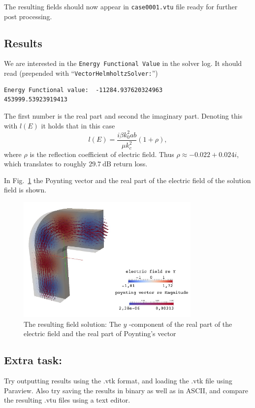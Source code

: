The resulting fields should now appear in \texttt{case0001.vtu} file ready for further post processing.

\subsection*{Results}
We are interested in the \texttt{Energy Functional Value} in the solver log. It should read (prepended with ``\texttt{VectorHelmholtzSolver:}'')

\small{
\begin{verbatim}
Energy Functional value:  -11284.937620324963        453999.53923919413
\end{verbatim}
}

The first number is the real part and second the imaginary part. Denoting this with $l(E)$ it holds that in this case \[l(E) = \frac {i \beta k_0^2 ab}{\mu k_c^2} (1+\rho),\] where $\rho$ is the reflection coefficient of electric field. Thus $\rho\approx-0.022+0.024i$, which translates to roughly $29.7~\mathrm{dB}$ return loss.

In Fig.~\ref{fig:solution} the Poynting vector and the real part of the electric field of the solution field is shown.

\begin{figure}[htbp]
\centering
\includegraphics[width=0.8\textwidth]{result.pdf}
\caption{The resulting field solution: The $y$ -component of the real part of the electric field and the real part of Poynting's vector}
\label{fig:solution}
\end{figure}

\subsection*{Extra task:}

Try outputting results using the .vtk format, and loading the .vtk file using Paraview.  Also try saving the results in binary as well as in ASCII, and compare the resulting .vtu files using a text editor.

